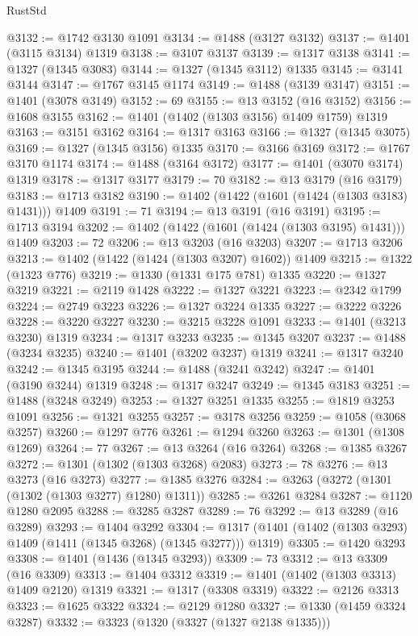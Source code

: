 \begin{lexlean}{RustStd}
\begin{coremodule}
@3132 := @1742 @3130 @1091
@3134 := @1488 (@3127 @3132)
@3137 := @1401 (@3115 @3134) @1319
@3138 := @3107 @3137
@3139 := @1317 @3138
@3141 := @1327 (@1345 @3083)
@3144 := @1327 (@1345 @3112) @1335
@3145 := @3141 @3144
@3147 := @1767 @3145 @1174
@3149 := @1488 (@3139 @3147)
@3151 := @1401 (@3078 @3149)
@3152 := 69
@3155 := @13 @3152 (@16 @3152)
@3156 := @1608 @3155
@3162 := @1401 (@1402 (@1303 @3156) @1409 @1759) @1319
@3163 := @3151 @3162
@3164 := @1317 @3163
@3166 := @1327 (@1345 @3075)
@3169 := @1327 (@1345 @3156) @1335
@3170 := @3166 @3169
@3172 := @1767 @3170 @1174
@3174 := @1488 (@3164 @3172)
@3177 := @1401 (@3070 @3174) @1319
@3178 := @1317 @3177
@3179 := 70
@3182 := @13 @3179 (@16 @3179)
@3183 := @1713 @3182
@3190 := @1402 (@1422 (@1601 (@1424 (@1303 @3183) @1431))) @1409
@3191 := 71
@3194 := @13 @3191 (@16 @3191)
@3195 := @1713 @3194
@3202 := @1402 (@1422 (@1601 (@1424 (@1303 @3195) @1431))) @1409
@3203 := 72
@3206 := @13 @3203 (@16 @3203)
@3207 := @1713 @3206
@3213 := @1402 (@1422 (@1424 (@1303 @3207) @1602)) @1409
@3215 := @1322 (@1323 @776)
@3219 := @1330 (@1331 @175 @781) @1335
@3220 := @1327 @3219
@3221 := @2119 @1428
@3222 := @1327 @3221
@3223 := @2342 @1799
@3224 := @2749 @3223
@3226 := @1327 @3224 @1335
@3227 := @3222 @3226
@3228 := @3220 @3227
@3230 := @3215 @3228 @1091
@3233 := @1401 (@3213 @3230) @1319
@3234 := @1317 @3233
@3235 := @1345 @3207
@3237 := @1488 (@3234 @3235)
@3240 := @1401 (@3202 @3237) @1319
@3241 := @1317 @3240
@3242 := @1345 @3195
@3244 := @1488 (@3241 @3242)
@3247 := @1401 (@3190 @3244) @1319
@3248 := @1317 @3247
@3249 := @1345 @3183
@3251 := @1488 (@3248 @3249)
@3253 := @1327 @3251 @1335
@3255 := @1819 @3253 @1091
@3256 := @1321 @3255
@3257 := @3178 @3256
@3259 := @1058 (@3068 @3257)
@3260 := @1297 @776
@3261 := @1294 @3260
@3263 := @1301 (@1308 @1269)
@3264 := 77
@3267 := @13 @3264 (@16 @3264)
@3268 := @1385 @3267
@3272 := @1301 (@1302 (@1303 @3268) @2083)
@3273 := 78
@3276 := @13 @3273 (@16 @3273)
@3277 := @1385 @3276
@3284 := @3263 (@3272 (@1301 (@1302 (@1303 @3277) @1280) @1311))
@3285 := @3261 @3284
@3287 := @1120 @1280 @2095
@3288 := @3285 @3287
@3289 := 76
@3292 := @13 @3289 (@16 @3289)
@3293 := @1404 @3292
@3304 := @1317 (@1401 (@1402 (@1303 @3293) @1409 (@1411 (@1345 @3268) (@1345 @3277))) @1319)
@3305 := @1420 @3293
@3308 := @1401 (@1436 (@1345 @3293))
@3309 := 73
@3312 := @13 @3309 (@16 @3309)
@3313 := @1404 @3312
@3319 := @1401 (@1402 (@1303 @3313) @1409 @2120) @1319
@3321 := @1317 (@3308 @3319)
@3322 := @2126 @3313
@3323 := @1625 @3322
@3324 := @2129 @1280
@3327 := @1330 (@1459 @3324 @3287)
@3332 := @3323 (@1320 (@3327 (@1327 @2138 @1335)))

\end{coremodule}
\end{lexlean}
